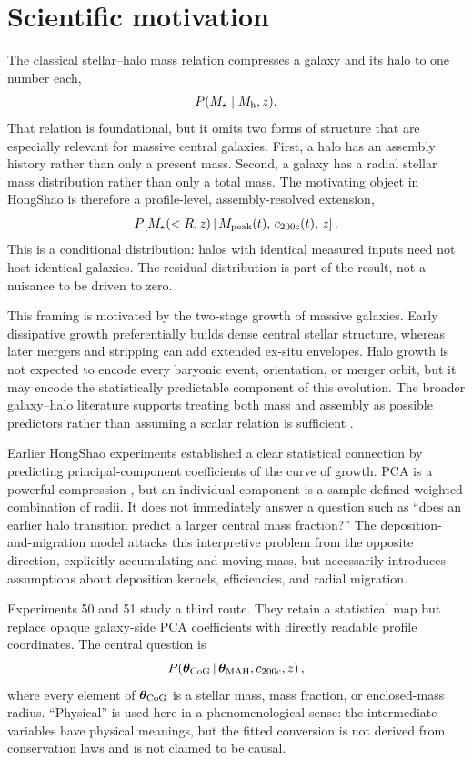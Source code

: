 \section{Scientific motivation}
\label{sec:motivation}

The classical stellar--halo mass relation compresses a galaxy and its halo to
one number each,
\begin{equation}
  P(M_\star\mid M_{\rm h},z).
\end{equation}
That relation is foundational, but it omits two forms of structure that are
especially relevant for massive central galaxies. First, a halo has an assembly
history rather than only a present mass. Second, a galaxy has a radial stellar
mass distribution rather than only a total mass. The motivating object in
HongShao is therefore a profile-level, assembly-resolved extension,
\begin{equation}
  P\!\left[M_\star(<R,z)\,\middle|\, M_{\mathrm{peak}}(t),\,c_{200\mathrm{c}}(t),\,z\right].
  \label{eq:ultimate_shmr}
\end{equation}
This is a conditional distribution: halos with identical measured inputs need
not host identical galaxies. The residual distribution is part of the result,
not a nuisance to be driven to zero.

This framing is motivated by the two-stage growth of massive galaxies. Early
dissipative growth preferentially builds dense central stellar structure,
whereas later mergers and stripping can add extended ex-situ envelopes. Halo
growth is not expected to encode every baryonic event, orientation, or merger
orbit, but it may encode the statistically predictable component of this
evolution. The broader galaxy--halo literature supports treating both mass and
assembly as possible predictors rather than assuming a scalar relation is
sufficient \citep{Wechsler2018}.

Earlier HongShao experiments established a clear statistical connection by
predicting principal-component coefficients of the curve of growth. PCA is a
powerful compression \citep{Jolliffe2002}, but an individual component is a
sample-defined weighted combination of radii. It does not immediately answer a
question such as ``does an earlier halo transition predict a larger central
mass fraction?'' The deposition-and-migration model attacks this interpretive
problem from the opposite direction, explicitly accumulating and moving mass,
but necessarily introduces assumptions about deposition kernels, efficiencies,
and radial migration.

Experiments 50 and 51 study a third route. They retain a statistical map but
replace opaque galaxy-side PCA coefficients with directly readable profile
coordinates. The central question is
\begin{equation}
  P\!\left(\bm{\theta}_{\mathrm{CoG}}\,\middle|\,
  \bm{\theta}_{\rm MAH},c_{200\mathrm{c}},z\right),
  \label{eq:central_question}
\end{equation}
where every element of $\bm{\theta}_{\mathrm{CoG}}$ is a stellar mass, mass fraction,
or enclosed-mass radius. ``Physical'' is used here in a phenomenological sense:
the intermediate variables have physical meanings, but the fitted conversion
is not derived from conservation laws and is not claimed to be causal.

